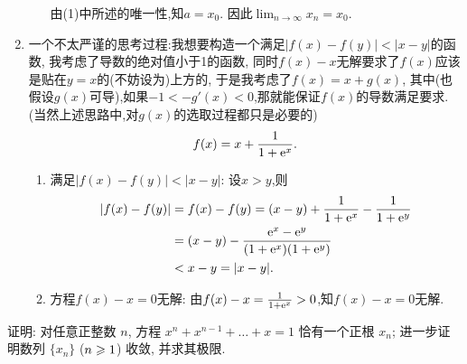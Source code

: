 \begin{solution}
\begin{enumerate}
\begin{enumerate}
                        由(1)中所述的唯一性,知$a = x_0$. 因此$\lim_{n \to \infty} x_n = x_0$.
              \end{enumerate}
        \item 一个不太严谨的思考过程:我想要构造一个满足$|f(x)-f(y)| < |x-y|$的函数, 我考虑了导数的绝对值小于1的函数, 同时$f(x)-x$无解要求了$f(x)$应该是贴在$y=x$的(不妨设为)上方的, 于是我考虑了$f(x) = x + g(x)$, 其中(也假设$g(x)$可导),如果$-1 < -g'(x) < 0$,那就能保证$f(x)$的导数满足要求.(当然上述思路中,对$g(x)$的选取过程都只是必要的)
              $$f(x) = x + \frac{1}{1 + \mathrm{e}^{x}}.$$
              \begin{enumerate}
                  \item 满足$|f(x)-f(y)| < |x-y|$:
                        设$x > y$,则
                        \begin{align*}
                            |f(x)-f(y)| & = f(x)-f(y) = (x-y) + \frac{1}{1+\mathrm{e}^x} - \frac{1}{1+\mathrm{e}^y} \\
                                        & = (x-y) - \frac{\mathrm{e}^x - \mathrm{e}^y}{(1+\mathrm{e}^x)(1+\mathrm{e}^y)}            \\
                                        & < x-y = |x-y|.
                        \end{align*}
                  \item 方程$f(x)-x=0$无解:
                        由$f(x)-x = \frac{1}{1+\mathrm{e}^x} > 0$,知$f(x)-x=0$无解.
              \end{enumerate}
    \end{enumerate}
\end{solution}

\begin{exercise}[2.C.9]
    证明: 对任意正整数 $n$, 方程 $x^n+x^{n-1}+\dots+x=1$ 恰有一个正根 $x_n$; 进一步证明数列 $\{x_n\}$ ($n \geqslant 1$) 收敛, 并求其极限.
\end{exercise}

